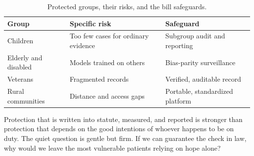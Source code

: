 \begin{table}[H]
\footnotesize
\begin{tabularx}{\textwidth}{@{}L{3.0cm} Y L{4.0cm}@{}}
\toprule
\textbf{Group} & \textbf{Specific risk} & \textbf{Safeguard}\\
\midrule
Children & Too few cases for ordinary evidence & Subgroup audit and reporting\\
Elderly and disabled & Models trained on others & Bias-parity surveillance\\
Veterans & Fragmented records & Verified, auditable record\\
Rural communities & Distance and access gaps & Portable, standardized platform\\
\bottomrule
\end{tabularx}
\caption{Protected groups, their risks, and the bill safeguards.}
\label{tab:protection}
\end{table}

Protection that is written into statute, measured, and reported is stronger than
protection that depends on the good intentions of whoever happens to be on duty.
The quiet question is gentle but firm. If we can guarantee the check in law, why
would we leave the most vulnerable patients relying on hope alone?
